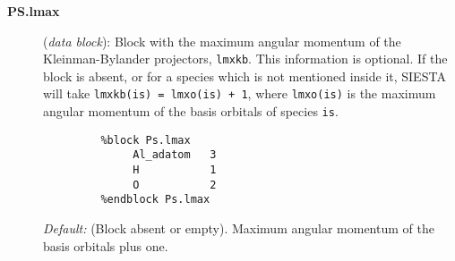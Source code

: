 \begin{description}










\item[{\bf PS.lmax}]  ({\it data block}): 
Block with the maximum angular momentum of the Kleinman-Bylander 
projectors, {\tt lmxkb}. 
This information is optional. If the block 
is absent, or for a species which is not mentioned inside 
it, SIESTA will take {\tt lmxkb(is) = lmxo(is) + 1}, where {\tt lmxo(is)}
is the maximum angular momentum of the basis orbitals of species {\tt is}.
\begin{verbatim}
         %block Ps.lmax
              Al_adatom   3
              H           1
              O           2
         %endblock Ps.lmax
\end{verbatim}
{\it Default:} (Block absent or empty). Maximum angular momentum 
of the basis orbitals plus one.
\noindent


\end{description}
